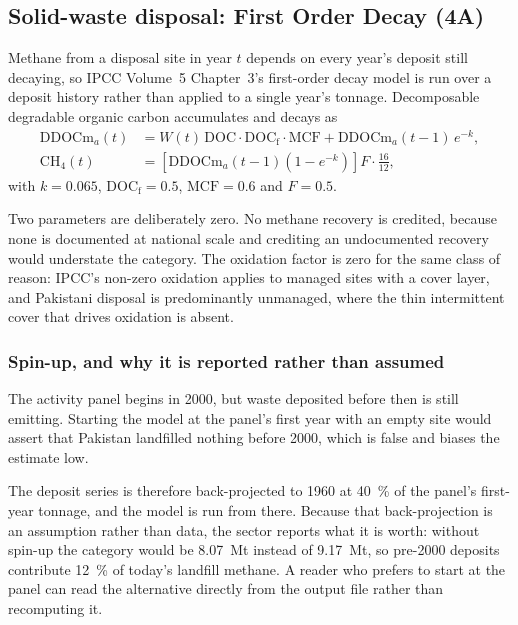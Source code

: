 \subsection{Solid-waste disposal: First Order Decay (4A)}

Methane from a disposal site in year $t$ depends on every year's deposit still decaying, so
IPCC Volume~5 Chapter~3's first-order decay model is run over a deposit history rather than
applied to a single year's tonnage. Decomposable degradable organic carbon accumulates and
decays as
\begin{align}
\mathrm{DDOCm}_{a}(t) &= W(t)\,\mathrm{DOC}\cdot\mathrm{DOC_f}\cdot\mathrm{MCF}
   + \mathrm{DDOCm}_{a}(t{-}1)\,e^{-k}, \\
\mathrm{CH_4}(t) &= \left[\mathrm{DDOCm}_{a}(t{-}1)\left(1 - e^{-k}\right)\right] F
   \cdot \tfrac{16}{12},
\end{align}
with $k = \num{0.065}$, $\mathrm{DOC_f} = \num{0.5}$, $\mathrm{MCF} = \num{0.6}$ and
$F = \num{0.5}$.

Two parameters are deliberately zero. No methane recovery is credited, because none is
documented at national scale and crediting an undocumented recovery would understate the
category. The oxidation factor is zero for the same class of reason: IPCC's non-zero oxidation
applies to managed sites with a cover layer, and Pakistani disposal is predominantly
unmanaged, where the thin intermittent cover that drives oxidation is absent.

\subsubsection{Spin-up, and why it is reported rather than assumed}

The activity panel begins in 2000, but waste deposited before then is still emitting. Starting
the model at the panel's first year with an empty site would assert that Pakistan landfilled
nothing before 2000, which is false and biases the estimate low.

The deposit series is therefore back-projected to 1960 at \SI{40}{\percent} of the panel's
first-year tonnage, and the model is run from there. Because that back-projection is an
assumption rather than data, the sector reports what it is worth: without spin-up the category
would be \SI{8.07}{\mega\tonne} instead of \SI{9.17}{\mega\tonne}, so pre-2000 deposits
contribute \SI{12}{\percent} of today's landfill methane. A reader who prefers to start at the
panel can read the alternative directly from the output file rather than recomputing it.

